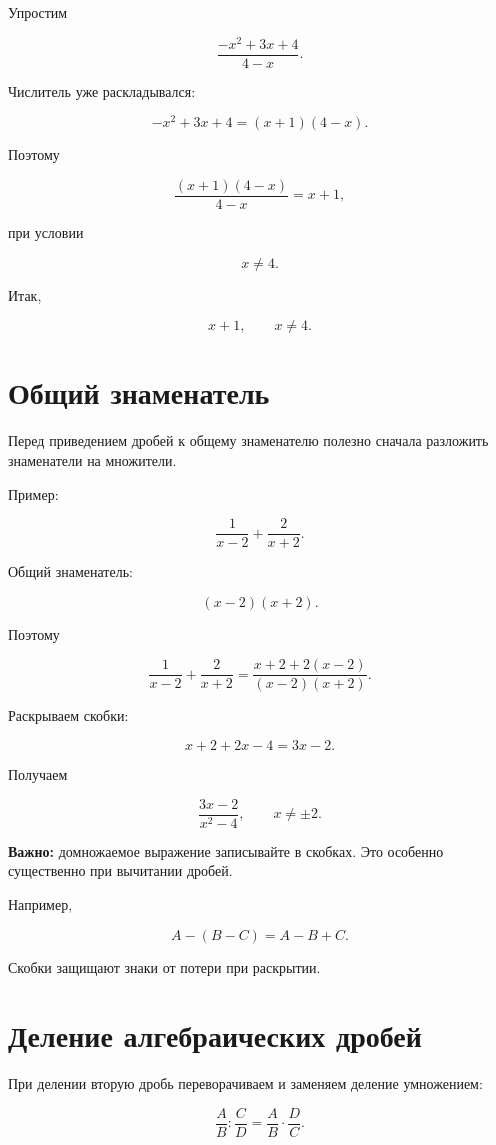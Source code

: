 \documentclass[a4paper,12pt]{article}
\newcommand{\term}[1]{\textbf{\color{darkaccent}#1}}
\begin{document}
Упростим

\[
\frac{-x^2+3x+4}{4-x}.
\]

Числитель уже раскладывался:

\[
-x^2+3x+4=(x+1)(4-x).
\]

Поэтому

\[
\frac{(x+1)(4-x)}{4-x}
=x+1,
\]

при условии

\[
x\ne4.
\]

Итак,

\[
\boxed{x+1},\qquad x\ne4.
\]


\section{Общий знаменатель}

Перед приведением дробей к общему знаменателю полезно сначала разложить
знаменатели на множители.

Пример:

\[
\frac{1}{x-2}+\frac{2}{x+2}.
\]

Общий знаменатель:

\[
(x-2)(x+2).
\]

Поэтому

\[
\frac{1}{x-2}+\frac{2}{x+2}
=
\frac{x+2+2(x-2)}
     {(x-2)(x+2)}.
\]

Раскрываем скобки:

\[
x+2+2x-4=3x-2.
\]

Получаем

\[
\boxed{
\frac{3x-2}{x^2-4}
},
\qquad
x\ne\pm2.
\]

\term{Важно:}
домножаемое выражение записывайте в скобках. Это особенно существенно
при вычитании дробей.

Например,

\[
A-(B-C)=A-B+C.
\]

Скобки защищают знаки от потери при раскрытии.


\section{Деление алгебраических дробей}

При делении вторую дробь переворачиваем и заменяем деление умножением:

\[
\frac{A}{B}:\frac{C}{D}
=
\frac{A}{B}\cdot\frac{D}{C}.
\]
\end{document}
